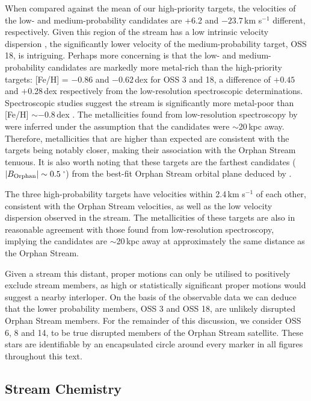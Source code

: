 \documentclass{emulateapj}
\begin{document}
When compared against the mean of our high-priority targets, the velocities of the low- and medium-probability candidates are +6.2 and $-23.7$\,km s$^{-1}$ different, respectively. Given this region of the stream has a low intrinsic velocity dispersion \citep{newberg;et-al_2010,casey;et-al_2013a}, the significantly lower velocity of the medium-probability target, OSS 18, is intriguing. Perhaps more concerning is that the low- and medium-probability candidates are markedly more metal-rich than the high-priority targets: [Fe/H] = $-0.86$ and $-0.62$\,dex for OSS 3 and 18, a difference of $+0.45$ and $+$0.28\,dex respectively from the low-resolution spectroscopic determinations. Spectroscopic studies suggest the stream is significantly more metal-poor than [Fe/H] $\sim -0.8$\,dex \citep{newberg;et-al_2010,casey;et-al_2013a,sesar;et-al_2013}. The metallicities found from low-resolution spectroscopy by \citet{casey;et-al_2013a} were inferred under the assumption that the candidates were $\sim$20\,kpc away. Therefore, metallicities that are higher than expected are consistent with the targets being notably closer, making their association with the Orphan Stream tenuous. It is also worth noting that these targets are the farthest candidates ($|B_{\rm Orphan}| \sim 0.5$\,$^\circ$) from the best-fit Orphan Stream orbital plane deduced by \citet{newberg;et-al_2010}.

The three high-probability targets have velocities within 2.4\,km s$^{-1}$ of each other, consistent with the Orphan Stream velocities, as well as the low velocity dispersion observed in the stream. The metallicities of these targets are also in reasonable agreement with those found from low-resolution spectroscopy, implying the candidates are $\sim$20\,kpc away at approximately the same distance as the Orphan Stream. 

Given a stream this distant, proper motions can only be utilised to positively exclude stream members, as high or statistically significant proper motions would suggest a nearby interloper. On the basis of the observable data we can deduce that the lower probability members, OSS 3 and OSS 18, are unlikely disrupted Orphan Stream members. For the remainder of this discussion, we consider OSS 6, 8 and 14, to be true disrupted members of the Orphan Stream satellite. These stars are identifiable by an encapsulated circle around every marker in all figures throughout this text.

\subsection{Stream Chemistry}
\end{document}
